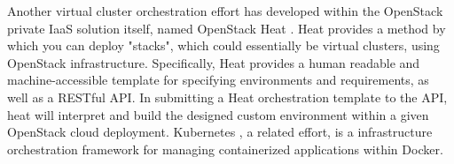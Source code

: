 Another virtual cluster orchestration effort has developed within the OpenStack private IaaS solution itself, named OpenStack Heat \cite{www-openstack-heat}. Heat provides a method by which you can deploy "stacks", which could essentially be virtual clusters,  using OpenStack infrastructure. Specifically, Heat provides a human readable and machine-accessible template for specifying environments and requirements, as well as a RESTful API. In submitting a Heat orchestration template to the API, heat will interpret and build the designed custom environment within a given OpenStack cloud deployment. Kubernetes \cite{bernstein2014containers}, a related effort, is a infrastructure orchestration framework for managing containerized applications within Docker.  



